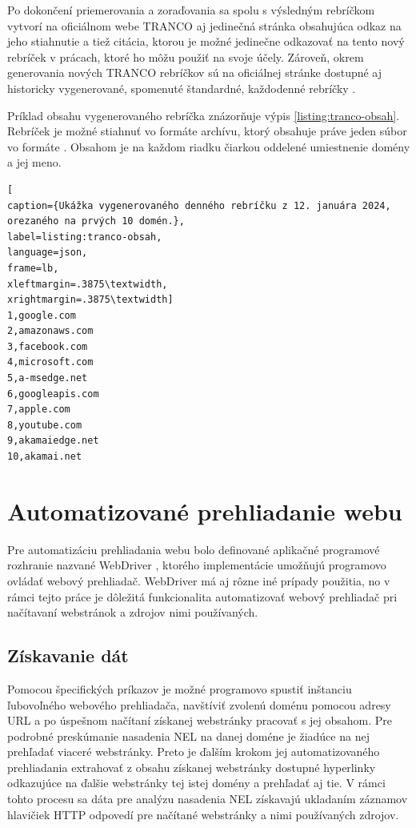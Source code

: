 \pagebreak

Po dokončení priemerovania a zoraďovania sa spolu s výsledným rebríčkom vytvorí na oficiálnom webe TRANCO aj jedinečná stránka obsahujúca odkaz na jeho stiahnutie a tiež citácia, 
ktorou je možné jedinečne odkazovať na tento nový rebríček v prácach, ktoré ho môžu použiť na svoje účely.
Zároveň, okrem generovania nových TRANCO rebríčkov sú na oficiálnej stránke dostupné aj historicky vygenerované, spomenuté štandardné, každodenné rebríčky \cite{tranco-homepage}.

Príklad obsahu vygenerovaného rebríčka znázorňuje výpis \ref{listing:tranco-obsah}.
Rebríček je možné stiahnuť vo formáte  archívu, ktorý obsahuje práve jeden súbor vo formáte . 
Obsahom je na každom riadku čiarkou oddelené umiestnenie domény a jej meno.

\begin{center}
\centering
\begin{lstlisting}[
caption={Ukážka vygenerovaného denného rebríčku z 12. januára 2024, orezaného na prvých 10 domén.},
label=listing:tranco-obsah, 
language=json, 
frame=lb,
xleftmargin=.3875\textwidth, 
xrightmargin=.3875\textwidth]
1,google.com
2,amazonaws.com
3,facebook.com
4,microsoft.com
5,a-msedge.net
6,googleapis.com
7,apple.com
8,youtube.com
9,akamaiedge.net
10,akamai.net

\end{lstlisting}
\end{center}


\section{Automatizované prehliadanie webu}
\label{selenium}

Pre automatizáciu prehliadania webu bolo definované aplikačné programové rozhranie nazvané WebDriver \cite{crawling-webdriver}, ktorého implementácie umožňujú programovo ovládať webový prehliadač.
WebDriver má aj rôzne iné prípady použitia, no v rámci tejto práce je dôležitá funkcionalita automatizovať webový prehliadač pri načítavaní webstránok a zdrojov nimi používaných. 

\subsection{Získavanie dát}

Pomocou špecifických príkazov je možné programovo spustiť inštanciu ľubovoľného webového prehliadača, navštíviť zvolenú doménu pomocou adresy URL a po úspešnom načítaní získanej webstránky pracovať s jej obsahom.
Pre podrobné preskúmanie nasadenia NEL na danej doméne je žiadúce na nej prehľadať viaceré webstránky.
Preto je ďalším krokom jej automatizovaného prehliadania extrahovať z obsahu získanej webstránky dostupné hyperlinky odkazujúce na ďalšie webstránky tej istej domény a prehľadať aj tie.
V rámci tohto procesu sa dáta pre analýzu nasadenia NEL získavajú ukladaním záznamov hlavičiek HTTP odpovedí pre načítané webstránky a nimi používaných zdrojov.

